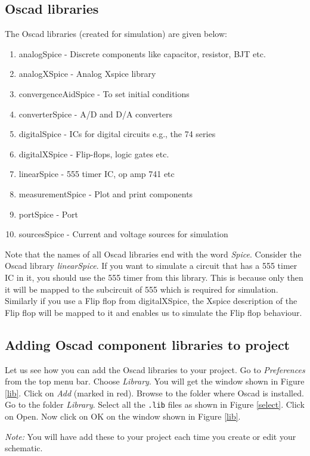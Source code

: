 \subsection{Oscad libraries}
The Oscad libraries (created for simulation) are given below:
\begin{enumerate}
\item analogSpice - Discrete components like capacitor, resistor, BJT etc.
\item analogXSpice - Analog Xspice library
\item convergenceAidSpice - To set initial conditions
\item converterSpice - A/D and D/A converters
\item digitalSpice - ICs for digital circuits e.g., the 74 series
\item digitalXSpice - Flip-flops, logic gates etc.
\item linearSpice - 555 timer IC, op amp 741 etc
\item measurementSpice - Plot and print components
\item portSpice - Port
\item sourcesSpice - Current and voltage sources for simulation
\end{enumerate}
Note that the names of all Oscad libraries end with the word \textit{Spice}. Consider the Oscad library \textit{linearSpice}. If you want to simulate a circuit that has a 555 timer IC in it, you should use the 555 timer from this library. This is because only then it will be mapped to the subcircuit of 555 which is required for simulation. Similarly if you use a Flip flop from digitalXSpice, the Xspice description of the Flip flop will be mapped to it and enables us to simulate the Flip flop behaviour.
\subsection{Adding Oscad component libraries to project}
\label{add}
Let us see how you can add the Oscad libraries to your project. Go to \textit{Preferences} from the top menu bar. Choose \textit{Library}. You will get the window shown in Figure \ref{lib}. Click on \textit{Add} (marked in red). Browse to the folder where Oscad is installed. Go to the folder \textit{Library}. Select all the {\tt *.lib} files as shown in Figure \ref{select}. Click on Open. Now click on OK on the window shown in Figure \ref{lib}. 

\textit{Note:} You will have add these to your project each time you create or edit your schematic.

